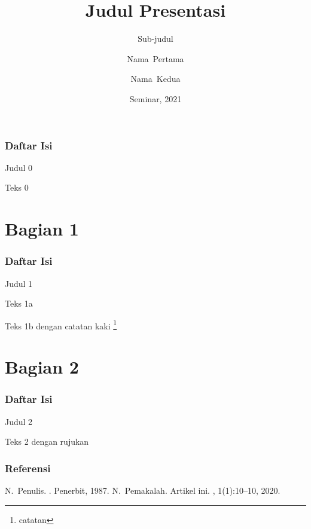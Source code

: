 \documentclass[aspectratio=169]{beamer}
\title[Judul Singkat]
{Judul Presentasi}
\subtitle{Sub-judul}
\author%
{Nama~Pertama\inst{1} \and Nama~Kedua\inst{2}}
\institute[Untirta] %
{
  \inst{1}%
  Jurusan Teknik Elektro\\
  Fakultas Teknik\\
  Universitas Sultan Ageng Tirtayasa, ID
  \and
  \inst{2}%
  Institusi\\
  Tempat
}
\date[ICIEE 2021] %
{Seminar, 2021}
\begin{document}
\frame{\titlepage}

\begin{frame}
\frametitle{Daftar Isi}
\tableofcontents%
\end{frame}

\begin{frame}{Judul 0}

Teks 0
 
\end{frame}

\section[]{Bagian 1}

\begin{frame}
\frametitle{Daftar Isi}
\tableofcontents[currentsection]
\end{frame}

\begin{frame}{Judul 1}

Teks 1a

\pause

Teks 1b dengan catatan kaki \footnote{catatan}
 
\end{frame}

\section[]{Bagian 2}

\begin{frame}
\frametitle{Daftar Isi}
\tableofcontents[currentsection]
\end{frame}

\begin{frame}{Judul 2}

Teks 2 dengan rujukan \cite{Pemakalah2020}
 
\end{frame}

\begin{frame}[allowframebreaks]
  \frametitle<presentation>{Referensi}    
  \begin{thebibliography}{10}    
  \beamertemplatebookbibitems
    N.~Penulis.
    .
    \newblock Penerbit, 1987.
  \beamertemplatearticlebibitems
    N.~Pemakalah.
    \newblock Artikel ini.
    , 1(1):10--10, 2020.
  \end{thebibliography}
\end{frame}
\end{document}
